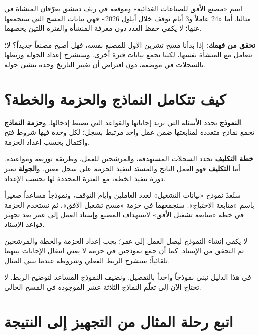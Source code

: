 \begin{rcnote}
اسم «مصنع الأفق للصناعات الغذائية» وموقعه في ريف دمشق يعرّفان المنشأة في مثالنا. أما «24 عاملاً و3 أيام توقف خلال أيلول 2026» فهي بيانات المسح التي سنجمعها عنها؛ لا يكفي حفظ العدد دون معرفة المنشأة والفترة اللتين يخصهما.
\end{rcnote}

\textbf{تحقق من فهمك:} إذا بدأنا مسح تشرين الأول للمصنع نفسه، فهل أصبح مصنعاً جديداً؟ لا؛ نتعامل مع المنشأة نفسها، لكننا نجمع بيانات فترة أخرى. وسنشرح إعداد الجولة وربطها بالسجلات في موضعه، دون افتراض أن تغيير التاريخ وحده ينشئ جولة.

\section{كيف تتكامل النماذج والحزمة والخطة؟}
\label{sec:observatory-building-blocks}

\textbf{النموذج} يحدد الأسئلة التي نريد إجاباتها والقواعد التي تضبط إدخالها. و\textbf{حزمة النماذج} تجمع نماذج متعددة لمتابعتها ضمن عمل واحد مرتبط بسجل؛ لكل وحدة فيها شروط فتح واكتمال بحسب إعداد الحزمة.

\textbf{خطة التكليف} تحدد السجلات المستهدفة، والمرشحين للعمل، وطريقة توزيعه ومواعيده. أما \textbf{التكليف} فهو العمل الناتج والمسنَد لتنفيذ الحزمة على سجل معين. و\textbf{الجولة} تميز دورة تنفيذ الخطة، مع الفترة المحددة لها بحسب الإعداد.

\begin{rcnote}
سنُعدّ نموذج «بيانات التشغيل» لعدد العاملين وأيام التوقف، ونموذجاً مساعداً صغيراً باسم «متابعة الاحتياج». سنجمعهما في حزمة «مسح تشغيل الأفق»، ثم نستخدم الحزمة في خطة «متابعة تشغيل الأفق» لاستهداف المصنع وإسناد العمل إلى عمر بعد تجهيز قواعد الإسناد.
\end{rcnote}

لا يكفي إنشاء النموذج ليصل العمل إلى عمر؛ يجب إعداد الحزمة والخطة والمرشحين ثم التحقق من الإسناد. كما أن جمع نموذجين في حزمة لا يعني انتقال الإجابات بينهما تلقائياً؛ سنشرح الربط الفعلي وشروطه عندما نبني المثال.

في هذا الدليل نبني نموذجاً واحداً بالتفصيل، ونضيف النموذج المساعد لتوضيح الربط. لا تحتاج الآن إلى تعلّم النماذج الثلاثة عشر الموجودة في المسح الحالي.

\section{اتبع رحلة المثال من التجهيز إلى النتيجة}
\label{sec:observatory-journey}

